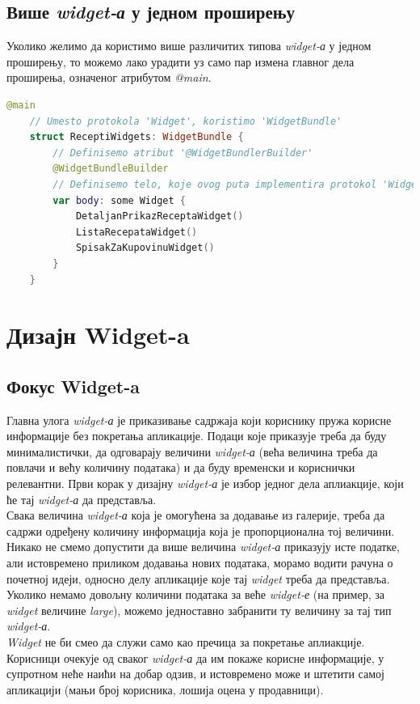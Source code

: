 \documentclass[12pt,oneside]{memoir}
\begin{document}
\subsection{Више \textit{widget-а} у једном проширењу}
\indent Уколико желимо да користимо више различитих типова \textit{widget-а} у једном проширењу, то можемо лако урадити уз само пар измена главног дела проширења, означеног атрибутом \textit{@main}. 

\begin{lstlisting}[caption=\textit{{Више widget-а у једном проширењу}}, label={lst:Више widget-а у једном проширењу}, language=Swift, frame=single]
    @main
    // Umesto protokola 'Widget', koristimo 'WidgetBundle'
    struct ReceptiWidgets: WidgetBundle {
        // Definisemo atribut '@WidgetBundlerBuilder'
        @WidgetBundleBuilder
        // Definisemo telo, koje ovog puta implementira protokol 'Widget'
        var body: some Widget {
            DetaljanPrikazReceptaWidget()
            ListaRecepataWidget()
            SpisakZaKupovinuWidget()
        }
    }
\end{lstlisting}

\section{Дизајн Widget-a}
\label{sec:Дизајн Widget-a}

\subsection{Фокус Widget-a}
\indent Главна улога \textit{widget-а} је приказивање садржаја који кориснику пружа корисне информације без покретања апликације. Подаци које приказује треба да буду минималистички, да одговарају величини \textit{widget-а} (већа величина треба да повлачи и већу количину података) и да буду временски и кориснички релевантни. Први корак у дизајну \textit{widget-а} је избор једног дела аплиакције, који ће тај \textit{widget-а} да представља. 
\\
\indent Свака величина \textit{widget-а} која је омогућена за додавање из галерије, треба да садржи одређену количину информација која је пропорционална тој величини. Никако не смемо допустити да више величина \textit{widget-а} приказују исте податке, али истовремено приликом додавања нових података, морамо водити рачуна о почетној идеји, односно делу апликације које тај \textit{widget} треба да представља. Уколико немамо довољну количини података за веће \textit{widget-е} (на пример, за \textit{widget} величине \textit{large}), можемо једноставно забранити ту величину за тај тип \textit{widget-а}. %
\\
\indent \textit{Widget} не би смео да служи само као пречица за покретање аплиакције. Корисници очекује од сваког \textit{widget-а} да им покаже корисне информације, у супротном неће наићи на добар одзив, и истовремено може и штетити самој апликацији (мањи број корисника, лошија оцена у продавници).
\end{document}
